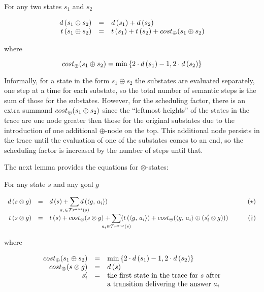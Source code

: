 \begin{lemma}
\label{lem:sum_estimation}
For any two states $s_1$ and $s_2$

\[
\begin{array}{rcl}
  d\,(s_1 \oplus s_2) &=& d\,(s_1) + d\,(s_2) \\

    t\,(s_1 \oplus s_2) &=& t\,(s_1) + t\,(s_2) + cost_{\oplus}(s_1 \oplus s_2)
\end{array}
\]

where

\[ cost_{\oplus}(s_1 \oplus s_2) = \min\,\{2\cdot d\,(s_1) - 1, 2\cdot d\,(s_2)\} \] 

\end{lemma}

Informally, for a state in the form $s_1 \oplus s_2$ the substates are evaluated separately, one step at a time for
each substate, so the total number of semantic steps is the sum of those for the substates. However, for the scheduling factor, 
there is an extra summand $cost_{\oplus}(s_1 \oplus s_2)$ since the ``leftmost heights'' of the states in the trace are one node greater then those for the
original substates due to the introduction of one additional $\oplus$-node on the top. This additional node persists in the trace until the evaluation
of one of the substates comes to an end, so the scheduling factor is increased by the number of steps until that.

The next lemma provides the equations for $\otimes$-states:

\begin{lemma}
For any state $s$ and any goal $g$

\[
\begin{array}{rclr}
d\,(s \otimes g)  &=&  d\,(s) + \smashoperator[lr]{\sum\limits_{a_i \in \tra{s}}} d\,(\taskst{g}{a_i})& \qquad(\star) \\

 t\,(s \otimes g)  &=&  t\,(s) + \costconj{s}{g} + \smashoperator[lr]{\sum\limits_{a_i \in \tra{s}}} (t\,(\taskst{g}{a_i}) + \costdisj{\taskst{g}{a_i}}{(s'_i \otimes g)})&\qquad(\dagger)
\end{array}
\]

where 

\[
\begin{array}{rcl}
cost_{\oplus}(s_1 \oplus s_2) & = & \min\,\{2\cdot d\,(s_1) - 1, 2\cdot d\,(s_2)\} \\
cost_{\otimes}(s \otimes g) & = & d\,(s) \\
s'_i & = & \mbox{the first state in the trace for $s$ after} \\
 & & \mbox{a transition delivering the answer $a_i$} \\
\end{array}
\]
\end{lemma}

